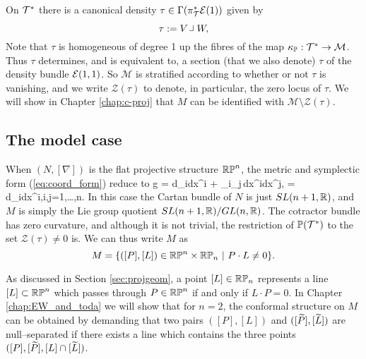 On $\mathcal{T}^*$ there is  a canonical density $\tau\in \Gamma(\pi_{\mathcal{T}}^*\mathcal{E}(1))$ given by
$$
\tau:= V\hook W,
$$
Note that $\tau$ is homogeneous of degree 1 up the fibres of the
map $\kappa_{\mathbb{P}}:\mathcal{T}^*\to \mathcal{M}$. Thus $\tau$ determines, and is equivalent
to, a section (that we also denote) $\tau$ of the density bundle $\mathcal{E}(1,1)$. So $\mathcal{M}$ is stratified according to
whether or not $\tau$ is vanishing, and we write $\mathcal{Z}(\tau)$
to denote, in particular, the zero locus of $\tau$. We will show in Chapter \ref{chap:c-proj} that $M$ can be identified with $\mathcal{M}\setminus \mathcal{Z}(\tau)$.



\subsection{The model case} \label{sec:intro_model}
When $(N,[\nabla])$ is the flat projective structure $\mathbb{RP}^n$, the metric and symplectic form (\ref{eq:coord_form}) reduce to
\be \label{eq:intro_model_g}
g = d\zeta_i\odot dx^i + \zeta_i\zeta_j\,dx^i\odot dx^j, \quad \Omega = d\zeta_i\wedge dx^i,\quad i,j=1,\dots,n.
\ee
In this case the Cartan bundle of $N$ is just $SL(n+1,\mathbb{R})$, and $M$ is simply the Lie group quotient $SL(n+1,\mathbb{R})/GL(n,\mathbb{R})$. The cotractor bundle has zero curvature, and although it is not trivial, the restriction of $\mathbb{P}(\mathcal{T}^*)$ to the set $\mathcal{Z}(\tau)\neq 0$ is. %
We can thus write $M$ as
\[
M=\{([P],[L])\in\RP^n\times\RP_n\ |\ P\cdot L\neq 0\}.
\]

As discussed in Section \ref{sec:projgeom}, a point $[L]\in\mathbb{RP}_n$ represents a line $[L]\subset\mathbb{RP}^n$ which passes through $P\in\mathbb{RP}^n$ if and only if $L\cdot P=0$. In Chapter \ref{chap:EW_and_toda} we will show that for $n=2$, the conformal structure on $M$ can be obtained by demanding that two pairs $([P], [L])$ and $([\widetilde{P}], [\widetilde{L}])$ are null--separated if there exists a line which contains the three points $([P], [\widetilde{P}], [L]\cap [\widetilde{L}])$.

